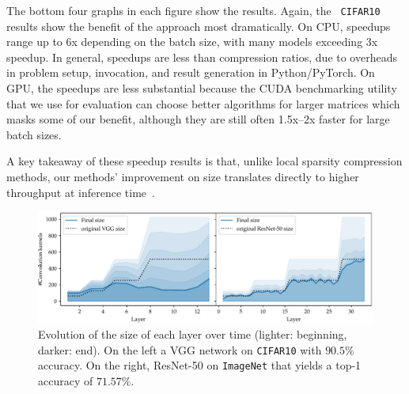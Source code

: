 The bottom four graphs in each figure show the results.  Again, the {\tt
CIFAR10} results show the benefit of the \shrink approach most dramatically.  On
CPU, speedups range up to 6x depending on the batch size, with many models
exceeding 3x speedup. In general, speedups are less than compression ratios, due
to overheads in problem setup, invocation, and result generation  in
Python/PyTorch.  On GPU, the speedups are less substantial because the CUDA
benchmarking utility that we use for evaluation can choose better algorithms for
larger matrices which masks some of our benefit, although they are still often
1.5x--2x faster for large batch sizes.

A key takeaway of these speedup results is that, unlike local sparsity
compression methods, our methods' improvement on size translates directly to
higher throughput at inference time~\cite{Han2015}.

\begin{figure}[htb]
\begin{center}
\vspace{-.1in}
\includegraphics[width=1\columnwidth]{size_evolution}
\vspace*{-5mm} 
\caption{ Evolution of the size of
  each layer over time (lighter: beginning, darker: end). On the left a VGG
  network on \texttt{CIFAR10} with $90.5\%$ accuracy. On the right, ResNet-50
  on \texttt{ImageNet} that yields a top-1 accuracy of $71.57\%$.
} 
\label{fig:network_size_evolution}
\end{center}
\vspace*{-4mm}
\end{figure}

